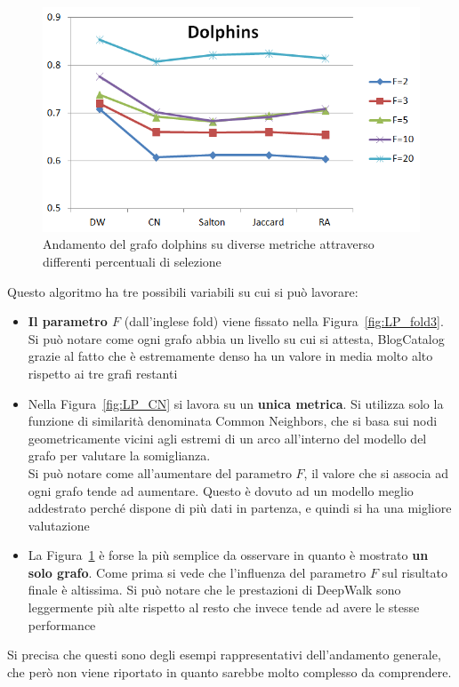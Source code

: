 %
\begin{figure}[htp]
	\centering
	\includegraphics[width=\linewidth]{immagini/LP_Dolphins}
	\caption{Andamento del grafo dolphins su diverse metriche attraverso differenti percentuali di selezione}
	\label{fig:LP_Dolphins}
\end{figure}
%
Questo algoritmo ha tre possibili variabili su cui si può lavorare:
\begin{itemize}
	\item \textbf{Il parametro $F$} (dall'inglese fold) viene fissato nella Figura~\ref{fig:LP_fold3}. Si può notare come ogni grafo abbia un livello su cui si attesta, BlogCatalog grazie al fatto che è estremamente denso ha un valore in media molto alto rispetto ai tre grafi restanti
	\item Nella Figura~\ref{fig:LP_CN} si lavora su un \textbf{unica metrica}. Si utilizza solo la funzione di similarità denominata Common Neighbors, che si basa sui nodi geometricamente vicini agli estremi di un arco all'interno del modello del grafo per valutare la somiglianza.\\
	Si può notare come all'aumentare del parametro $F$, il valore che si associa ad ogni grafo tende ad aumentare. Questo è dovuto ad un modello meglio addestrato perché dispone di più dati in partenza, e quindi si ha una migliore valutazione
	\item La Figura~\ref{fig:LP_Dolphins} è forse la più semplice da osservare in quanto è mostrato \textbf{un solo grafo}. Come prima si vede che l'influenza del parametro $F$ sul risultato finale è altissima. Si può notare che le prestazioni di DeepWalk sono leggermente più alte rispetto al resto che invece tende ad avere le stesse performance 
\end{itemize}
Si precisa che questi sono degli esempi rappresentativi dell'andamento generale, che però non viene riportato in quanto sarebbe molto complesso da comprendere.
%
